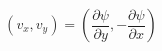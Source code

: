 \documentclass[preview]{standalone}
\begin{document}
\setcounter{equation}{6}
\begin{equation}
    \left( v_x, v_y \right) = \left( \frac{\partial \psi}{\partial y}, -\frac{\partial \psi}{\partial x} \right)
\end{equation}
\end{document}
